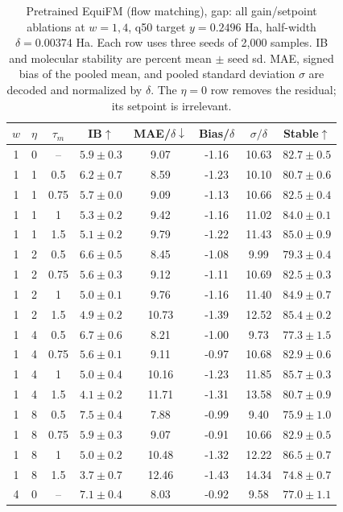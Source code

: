 \documentclass{article}
\begin{document}
\begin{table}[!htbp]
\centering\small
\caption{Pretrained EquiFM (flow matching), gap: all gain/setpoint ablations at $w=1,4$, q50 target $y=0.2496$ Ha, half-width $\delta=0.00374$ Ha. Each row uses three seeds of 2,000 samples. IB and molecular stability are percent mean $\pm$ seed sd. MAE, signed bias of the pooled mean, and pooled standard deviation $\sigma$ are decoded and normalized by $\delta$. The $\eta=0$ row removes the residual; its setpoint is irrelevant.}
\label{tab:grid-equifm-gap}
\begin{tabular}{cccccccc}
\toprule
$w$ & $\eta$ & $\tau_m$ & IB$\uparrow$ & MAE/$\delta\downarrow$ & Bias/$\delta$ & $\sigma/\delta$ & Stable$\uparrow$\\
\midrule
1 & 0 & -- & $5.9\pm0.3$ & 9.07 & -1.16 & 10.63 & $82.7\pm0.5$\\
1 & 1 & 0.5 & $6.2\pm0.7$ & 8.59 & -1.23 & 10.10 & $80.7\pm0.6$\\
1 & 1 & 0.75 & $5.7\pm0.0$ & 9.09 & -1.13 & 10.66 & $82.5\pm0.4$\\
1 & 1 & 1 & $5.3\pm0.2$ & 9.42 & -1.16 & 11.02 & $84.0\pm0.1$\\
1 & 1 & 1.5 & $5.1\pm0.2$ & 9.79 & -1.22 & 11.43 & $85.0\pm0.9$\\
1 & 2 & 0.5 & $6.6\pm0.5$ & 8.45 & -1.08 & 9.99 & $79.3\pm0.4$\\
1 & 2 & 0.75 & $5.6\pm0.3$ & 9.12 & -1.11 & 10.69 & $82.5\pm0.3$\\
1 & 2 & 1 & $5.0\pm0.1$ & 9.76 & -1.16 & 11.40 & $84.9\pm0.7$\\
1 & 2 & 1.5 & $4.9\pm0.2$ & 10.73 & -1.39 & 12.52 & $85.4\pm0.2$\\
1 & 4 & 0.5 & $6.7\pm0.6$ & 8.21 & -1.00 & 9.73 & $77.3\pm1.5$\\
1 & 4 & 0.75 & $5.6\pm0.1$ & 9.11 & -0.97 & 10.68 & $82.9\pm0.6$\\
1 & 4 & 1 & $5.0\pm0.4$ & 10.16 & -1.23 & 11.85 & $85.7\pm0.3$\\
1 & 4 & 1.5 & $4.1\pm0.2$ & 11.71 & -1.31 & 13.58 & $80.7\pm0.9$\\
1 & 8 & 0.5 & $7.5\pm0.4$ & 7.88 & -0.99 & 9.40 & $75.9\pm1.0$\\
1 & 8 & 0.75 & $5.9\pm0.3$ & 9.07 & -0.91 & 10.66 & $82.9\pm0.5$\\
1 & 8 & 1 & $5.0\pm0.2$ & 10.48 & -1.32 & 12.22 & $86.5\pm0.7$\\
1 & 8 & 1.5 & $3.7\pm0.7$ & 12.46 & -1.43 & 14.34 & $74.8\pm0.7$\\
\midrule
4 & 0 & -- & $7.1\pm0.4$ & 8.03 & -0.92 & 9.58 & $77.0\pm1.1$\\

\end{tabular}
\end{table}
\end{document}
